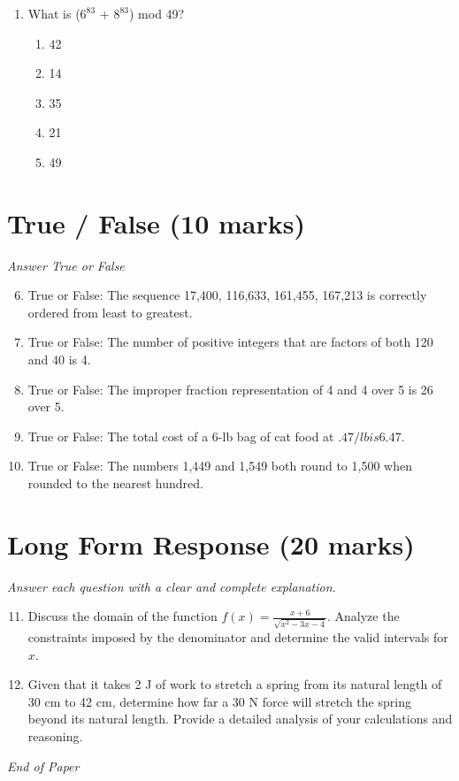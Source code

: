 \documentclass[12pt]{article}
\begin{document}
\begin{enumerate}[label=\arabic*.]
\begin{enumerate}[label=(\alph*)]
    \item -2.0
    \item 3.0
    \item 2.0
    \item 1.5
\end{enumerate}
\item What is ($6^83$ + $8^83$) mod 49?
\begin{enumerate}[label=(\alph*)]
    \item 42
    \item 14
    \item 35
    \item 21
    \item 49
\end{enumerate}
\end{enumerate}

\section*{True / False (10 marks)}
\textit{Answer True or False}
\begin{enumerate}[label=\arabic*.]
\setcounter{enumi}{5}
\item True or False: The sequence 17,400, 116,633, 161,455, 167,213 is correctly ordered from least to greatest.
\item True or False: The number of positive integers that are factors of both 120 and 40 is 4.
\item True or False: The improper fraction representation of 4 and 4 over 5 is 26 over 5.
\item True or False: The total cost of a 6-lb bag of cat food at $.47/lb is $6.47.
\item True or False: The numbers 1,449 and 1,549 both round to 1,500 when rounded to the nearest hundred.
\end{enumerate}

\section*{Long Form Response (20 marks)}
\textit{Answer each question with a clear and complete explanation.}
\begin{enumerate}[label=\arabic*.]
\setcounter{enumi}{10}
\item Discuss the domain of the function \( f(x) = \frac{x+6}{\sqrt{x^2-3 x-4}} \). Analyze the constraints imposed by the denominator and determine the valid intervals for \( x \).
\item Given that it takes 2 J of work to stretch a spring from its natural length of 30 cm to 42 cm, determine how far a 30 N force will stretch the spring beyond its natural length. Provide a detailed analysis of your calculations and reasoning.
\end{enumerate}

\vfill
\noindent\textit{End of Paper}
\end{document}
